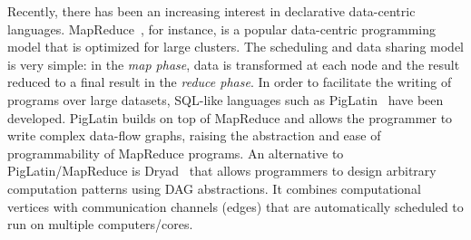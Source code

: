 Recently, there has been an increasing interest in declarative data-centric
languages. MapReduce~\cite{Dean:2008:MSD:1327452.1327492}, for instance, is a
popular data-centric programming model that is optimized for large clusters. The
scheduling and data sharing model is very simple: in the \emph{map phase}, data
is transformed at each node and the result reduced to a final result in the
\emph{reduce phase}. In order to facilitate the writing of programs over large
datasets, SQL-like languages such as
PigLatin~\cite{Olston:2008:PLN:1376616.1376726} have been developed. PigLatin
builds on top of MapReduce and allows the programmer to write complex data-flow
graphs, raising the abstraction and ease of programmability of MapReduce
programs. An alternative to PigLatin/MapReduce is
Dryad~\cite{Isard:2007:DDD:1272996.1273005} that allows programmers to design
arbitrary computation patterns using DAG abstractions. It combines computational
vertices with communication channels (edges) that are automatically scheduled to
run on multiple computers/cores.

